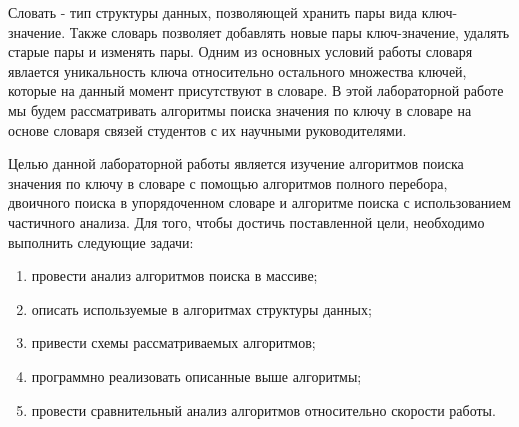 \Introduction
Словать - тип структуры данных, позволяющей хранить пары вида ключ-значение. Также словарь позволяет добавлять новые пары ключ-значение, удалять старые пары и изменять пары. Одним из основных условий работы словаря явлается уникальность ключа относительно остального множества ключей, которые на данный момент присутствуют в словаре. В этой лабораторной работе мы будем рассматривать алгоритмы поиска значения по ключу в словаре на основе словаря связей студентов с их научными руководителями. 

Целью данной лабораторной работы является изучение алгоритмов поиска значения по ключу в словаре с помощью алгоритмов полного перебора, двоичного поиска в упорядоченном словаре и алгоритме поиска с использованием частичного анализа. Для того, чтобы достичь поставленной цели, необходимо выполнить следующие задачи:

\begin{enumerate}
	\item провести анализ алгоритмов поиска в массиве;
	\item описать используемые в алгоритмах структуры данных;
	\item привести схемы рассматриваемых алгоритмов;
	\item программно реализовать описанные выше алгоритмы;
	\item провести сравнительный анализ алгоритмов относительно скорости работы.
\end{enumerate}